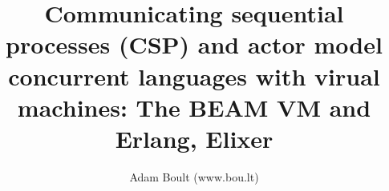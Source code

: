 \documentclass[oneside]{book}
\begin{document}
\author{Adam Boult (www.bou.lt)}
\title{Communicating sequential processes (CSP) and actor model concurrent languages with virual machines: The BEAM VM and Erlang, Elixer}
\maketitle

\setcounter{tocdepth}{0}
\tableofcontents


\end{document}
